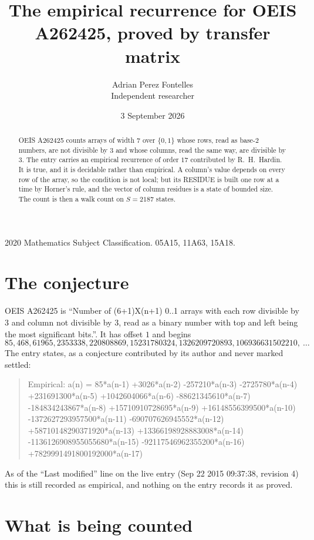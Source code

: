 \documentclass[11pt,a4paper]{article}
\title{The empirical recurrence for OEIS A262425, proved by transfer matrix}
\author{Adrian Perez Fontelles\\ \small Independent researcher}
\date{3 September 2026}
\theoremstyle{plain}
\theoremstyle{definition}
\begin{document}
\maketitle

\begin{abstract}
OEIS A262425 counts arrays of width $7$ over $\{0,1\}$ whose rows, read as base-$2$
numbers, are not divisible by $3$ and whose columns, read the same way, are divisible by
$3$. The entry carries an empirical recurrence of order $17$ contributed by
R.~H.~Hardin. It is true, and it is decidable rather than empirical. A column's value depends on
every row of the array, so the condition is not local; but its RESIDUE is built one row at a
time by Horner's rule, and the vector of column residues is a state of bounded size. The count
is then a walk count on $S=2187$ states.
\end{abstract}

\noindent\small 2020 Mathematics Subject Classification. 05A15, 11A63, 15A18.\normalsize

\section{The conjecture}

OEIS A262425 is ``Number of (6+1)X(n+1) 0..1 arrays with each row divisible by 3 and column not divisible by 3, read as a binary number with top and left being the most significant bits.''. It has offset $1$ and begins
\[
85, 468, 61965, 2353338, 220808869, 15231780324, 1326209720893, 106936631502210,\ \dots
\]
The entry states, as a conjecture contributed by its author and never marked settled:
\begin{quote}
Empirical: a(n) = 85*a(n-1) +3026*a(n-2) -257210*a(n-3) -2725780*a(n-4) +231691300*a(n-5) +1042604066*a(n-6) -88621345610*a(n-7) -184834243867*a(n-8) +15710910728695*a(n-9) +16148556399500*a(n-10) -1372627293957500*a(n-11) -690707626945552*a(n-12) +58710148290371920*a(n-13) +13366198928883008*a(n-14) -1136126908955055680*a(n-15) -92117546962355200*a(n-16) +7829991491800192000*a(n-17)
\end{quote}
As of the ``Last modified'' line on the live entry (Sep 22 2015 09:37:38, revision 4) this is still
recorded as empirical, and nothing on the entry records it as proved.

\section{What is being counted}
\end{document}
